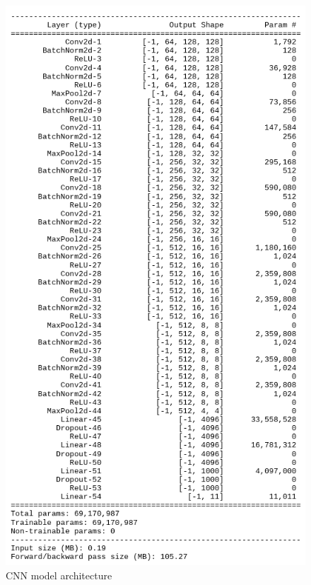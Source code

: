 \documentclass[a4paper,11pt]{article}
\begin{document}
\begin{enumerate}
		\begin{figure}[htp]
		    \begin{center}
		    		\includegraphics[scale=0.35]{./cnn_architecture.png}
		    	\caption{CNN model architecture}
		    \end{center}
		\end{figure}

\newpage


\end{enumerate}
\end{document}
